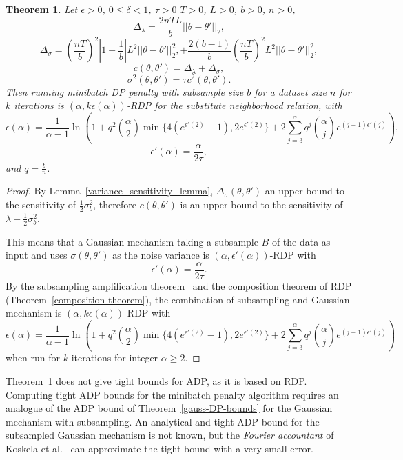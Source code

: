 \documentclass[english,twoside,openright]{HYgraduMLDS}
\newtheorem{theorem}[lemma]{Theorem}
\begin{document}
\begin{theorem}\label{dp_penalty_minibatch_theorem}
  Let \(\epsilon > 0\), \(0 \leq \delta < 1\), \(\tau > 0\) \(T > 0\),
  \(L > 0\), \(b > 0\), \(n > 0\),
  \[
    \Delta_\lambda = \frac{2nTL}{b}||\theta - \theta'||_2,
  \]
  \[
    \Delta_\sigma = \left(\frac{nT}{b}\right)^2 \left|1 - \frac{1}{b}\right|
    L^2||\theta - \theta'||_2^2,
    + \frac{2(b - 1)}{b}\left(\frac{nT}{b}\right)^2 L^2||\theta - \theta'||^2_2,
  \]
  \[
    c(\theta, \theta') = \Delta_\lambda + \Delta_\sigma,
  \]
  \[
    \sigma^2(\theta, \theta') = \tau c^2(\theta, \theta').
  \]
  Then running minibatch DP penalty with subsample size \(b\) for a dataset
  size \(n\) for \(k\) iterations
  is \((\alpha, k\epsilon(\alpha))\)-RDP for the substitute neighborhood
  relation, with
  \[
    \epsilon(\alpha) = \frac{1}{\alpha - 1}\ln \left(
      1 + q^2\binom{\alpha}{2}\min\{4(e^{\epsilon'(2)} - 1), 2e^{\epsilon'(2)}\}
      + 2 \sum_{j=3}^\alpha q^j\binom{\alpha}{j}e^{(j-1)\epsilon'(j)}\right),
  \]
  \[
    \epsilon'(\alpha) = \frac{\alpha}{2\tau},
  \]
  and \(q = \frac{b}{n}\).
\end{theorem}
\begin{proof}
    By Lemma~\ref{variance_sensitivity_lemma}, 
    \(\Delta_\sigma(\theta, \theta')\) an upper 
    bound to the sensitivity of \(\frac{1}{2}\sigma_b^2\), therefore 
    \(c(\theta, \theta')\) is an upper bound to the sensitivity of 
    \(\lambda - \frac{1}{2}\sigma_b^2\).

    This means that a Gaussian mechanism taking a subsample \(B\) of the data as 
    input and uses \(\sigma(\theta, \theta')\) as the noise variance 
    is \((\alpha, \epsilon'(\alpha))\)-RDP with 
    \[
        \epsilon'(\alpha) = \frac{\alpha}{2\tau}.
    \]
    By the subsampling amplification theorem~\cite[Theorem 9]{WangBK19} and 
    the composition theorem of RDP (Theorem~\ref{composition-theorem}),
    the combination of subsampling and Gaussian mechanism is 
    \((\alpha, k\epsilon(\alpha))\)-RDP with 
    \[
        \epsilon(\alpha) = \frac{1}{\alpha - 1}\ln \left(
        1 + q^2\binom{\alpha}{2}\min\{4(e^{\epsilon'(2)} - 1), 2e^{\epsilon'(2)}\}
        + 2 \sum_{j=3}^\alpha q^j\binom{\alpha}{j}e^{(j-1)\epsilon'(j)}\right)
    \]
    when run for \(k\) iterations for integer \(\alpha \geq 2\).
\end{proof}

Theorem~\ref{dp_penalty_minibatch_theorem} does not give tight bounds for ADP,
as it is based on RDP. Computing tight ADP bounds for the minibatch penalty
algorithm requires an analogue of the ADP bound of Theorem~\ref{gauss-DP-bounds}
for the Gaussian mechanism with subsampling. An analytical and tight ADP bound for
the subsampled Gaussian mechanism is not known, but the \emph{Fourier accountant}
of Koskela et al.~\cite{KJH20} can approximate the tight bound with a very small
error.
\end{document}
